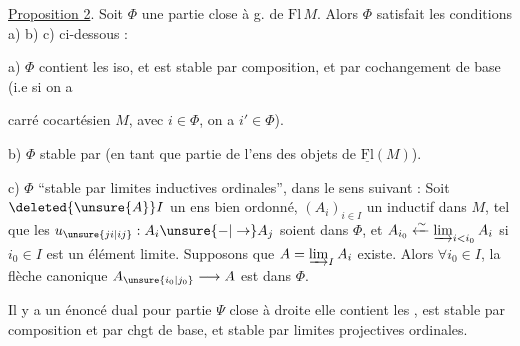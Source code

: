 \uline{Proposition 2}. Soit $\Phi$ une partie close à g. de $\mathrm{Fl}\,M$. Alors $\Phi$ satisfait les conditions a) b) c) ci-dessous :

a) $\Phi$ contient les iso, et est stable par composition, et par cochangement de base (i.e si on a



carré cocartésien  $M$, avec $i\in\Phi$, on a $i'\in\Phi$).

b) $\Phi$ stable par  (en tant que partie de l'ens des objets de $\underline{\mathrm{Fl}}(M)$).

c) $\Phi$  ``stable par limites inductives ordinales'', dans le sens suivant : Soit $\deleted{\unsure{A}}I$ un ens bien ordonné, $(A_i)_{i\in I}$ un  inductif dans $M$, tel que les $u_{\unsure{ji|ij}}:A_i\unsure{-|\to}A_j$ soient dans $\Phi$, et $A_{i_0}\xleftarrow{\sim}\varinjlim_{i<i_0} A_i$ si $i_0\in I$ est un élément limite. Supposons que $A=\varinjlim_I A_i$ existe. Alors $\forall i_0\in I$, la flèche canonique $A_{\unsure{i_0|j_0}}\longrightarrow A$ est dans $\Phi$.

Il y a un énoncé dual pour  partie $\Psi$ close à droite  elle contient les , est stable par composition et par chgt de base,  et stable par limites projectives ordinales.



